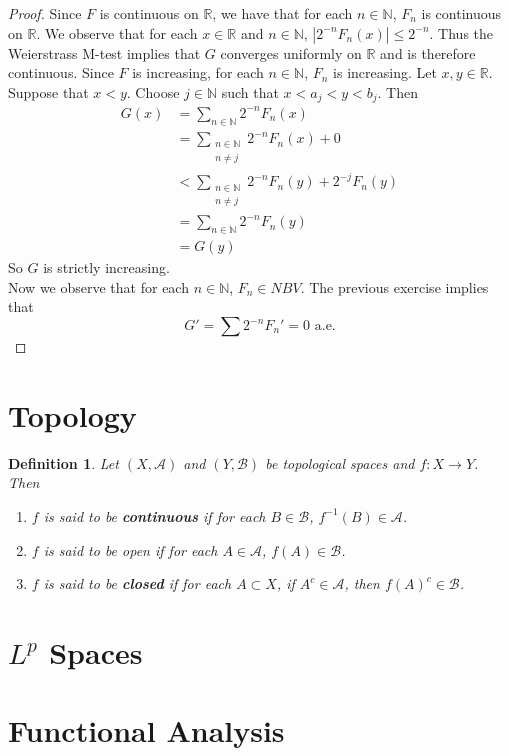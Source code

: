 \documentclass[12pt]{amsart}
\newtheorem{defn}[thm]{Definition}
\newcommand{\N}{\mathbb{N}}
\newcommand{\R}{\mathbb{R}}
\newcommand{\MA}{\mathcal{A}}
\newcommand{\MB}{\mathcal{B}}
\begin{document}
\begin{proof}
Since $F$ is continuous on $\R$, we have that for each $n \in \N$, $F_n$ is continuous on $\R$. We observe that for each $x \in \R$ and $n \in \N$, $|2^{-n}F_n(x)| \leq 2^{-n}$. Thus the Weierstrass M-test implies that $G$ converges uniformly on $\R$ and is therefore continuous. Since $F$ is increasing, for each $n \in \N$, $F_n$ is increasing. Let $x, y \in \R$. Suppose that $x<y$. Choose $j \in \N$ such that $x<a_j<y<b_j$. Then 
\begin{align*}
G(x) 
&= \sum_{n \in \N}2^{-n}F_n(x)\\
&= \sum_{\substack{n \in \N \\ n \neq j}}2^{-n}F_n(x) + 0\\
& < \sum_{\substack{n \in \N \\ n \neq j}}2^{-n}F_n(y) + 2^{-j}F_n(y)\\
&=\sum_{n \in \N}2^{-n}F_n(y)\\
&=G(y)
\end{align*}
So $G$ is strictly increasing.\\
Now we observe that for each $n \in \N$, $F_n \in NBV$. The previous exercise implies that $$G' = \sum 2^{-n}F_n'=0 \text{ a.e.}$$
\end{proof}

\section{Topology}

\begin{defn}
Let $(X,\MA)$ and $(Y,\MB)$ be topological spaces and $f:X \rightarrow Y$. Then 
\begin{enumerate}
\item $f$ is said to be \textbf{continuous} if for each $B \in \MB$, $f^{-1}(B) \in \MA$.
\item $f$ is said to be open if for each $A \in \MA$, $f(A) \in \MB$.
\item $f$ is said to be \textbf{closed} if for each $A \subset X$, if $A^c \in \MA$, then $f(A)^c \in \MB$.
\end{enumerate}
\end{defn}

\section{$L^{p}$ Spaces}

\section{Functional Analysis}
\end{document}
